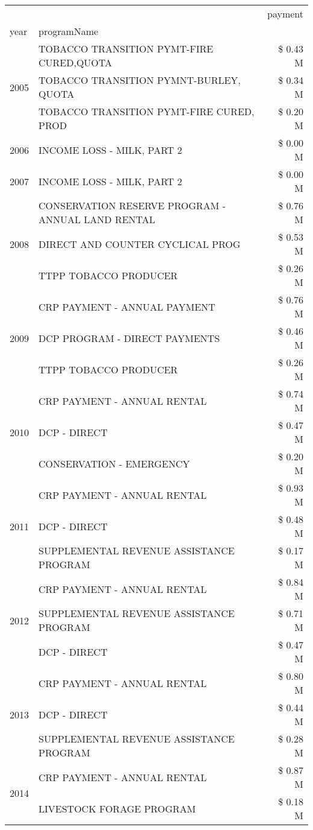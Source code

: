 \begin{tabular}{llr}
\toprule
 &  & payment \\
year & programName &  \\
\midrule
\multirow[t]{3}{*}{2005} & TOBACCO TRANSITION PYMT-FIRE CURED,QUOTA & \$ 0.43 M \\
 & TOBACCO TRANSITION PYMNT-BURLEY, QUOTA & \$ 0.34 M \\
 & TOBACCO TRANSITION PYMT-FIRE CURED, PROD & \$ 0.20 M \\
\cline{1-3}
2006 & INCOME LOSS - MILK, PART 2 & \$ 0.00 M \\
\cline{1-3}
2007 & INCOME LOSS - MILK, PART 2 & \$ 0.00 M \\
\cline{1-3}
\multirow[t]{3}{*}{2008} & CONSERVATION RESERVE PROGRAM - ANNUAL LAND RENTAL & \$ 0.76 M \\
 & DIRECT AND COUNTER CYCLICAL PROG & \$ 0.53 M \\
 & TTPP TOBACCO PRODUCER & \$ 0.26 M \\
\cline{1-3}
\multirow[t]{3}{*}{2009} & CRP PAYMENT - ANNUAL PAYMENT & \$ 0.76 M \\
 & DCP PROGRAM - DIRECT PAYMENTS & \$ 0.46 M \\
 & TTPP TOBACCO PRODUCER & \$ 0.26 M \\
\cline{1-3}
\multirow[t]{3}{*}{2010} & CRP PAYMENT - ANNUAL RENTAL & \$ 0.74 M \\
 & DCP - DIRECT & \$ 0.47 M \\
 & CONSERVATION - EMERGENCY & \$ 0.20 M \\
\cline{1-3}
\multirow[t]{3}{*}{2011} & CRP PAYMENT - ANNUAL RENTAL & \$ 0.93 M \\
 & DCP - DIRECT & \$ 0.48 M \\
 & SUPPLEMENTAL REVENUE ASSISTANCE PROGRAM & \$ 0.17 M \\
\cline{1-3}
\multirow[t]{3}{*}{2012} & CRP PAYMENT - ANNUAL RENTAL & \$ 0.84 M \\
 & SUPPLEMENTAL REVENUE ASSISTANCE PROGRAM & \$ 0.71 M \\
 & DCP - DIRECT & \$ 0.47 M \\
\cline{1-3}
\multirow[t]{3}{*}{2013} & CRP PAYMENT - ANNUAL RENTAL & \$ 0.80 M \\
 & DCP - DIRECT & \$ 0.44 M \\
 & SUPPLEMENTAL REVENUE ASSISTANCE PROGRAM & \$ 0.28 M \\
\cline{1-3}
\multirow[t]{3}{*}{2014} & CRP PAYMENT - ANNUAL RENTAL & \$ 0.87 M \\
 & LIVESTOCK FORAGE PROGRAM & \$ 0.18 M \\

\end{tabular}
